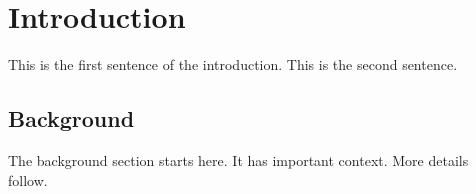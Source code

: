 \section{Introduction}
\label{sec:intro}
This is the first sentence of the introduction. This is the second sentence.

\subsection{Background}
The background section starts here. It has important context. More details follow.
